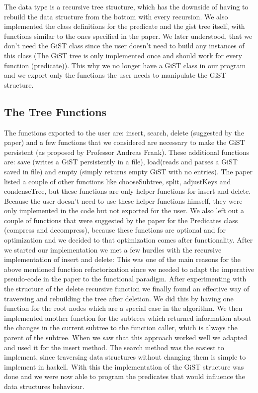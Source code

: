 \documentclass{scrartcl}
\begin{document}
 The data type is a recursive tree structure, which has the downside of having to rebuild the data structure from the bottom with every recursion.
 We also implemented the class definitions for the predicate and the gist tree itself, with functions similar to the ones specified in the paper. 
 We later understood, that we don't need the GiST class since the user doesn't need to build any instances of this class (The GiST tree is only implemented once and should work
 for every function (predicate)). This why we no longer have a GiST class in our program and we export only the functions the user needs to manipulate the GiST structure.
\subsection{The Tree Functions}
The functions exported to the user are: insert, search, delete (suggested by the paper) and a few functions that we considered are necessary to make the GiST persistent (as proposed by Professor Andreas Frank).
These additional functions are: save (writes a GiST persistently in a file), load(reads and parses a GiST saved in file) and empty (simply returns empty GiST with no entries).
The paper \cite{Hellerstein95generalizedsearch} listed a couple of other functions like chooseSubtree, split, adjustKeys and condenseTree, but these functions are only helper functions for insert and delete.
Because the user doesn't need to use these helper functions himself, they were only implemented in the code but not exported for the user.
We also left out a couple of functions that were suggested by the paper for the Predicates class (compress and decompress), because these functions are optional and for optimization and
we decided to that optimization comes after functionality.
After we started our implementation we met a few hurdles with the recursive implementation of insert and delete: This was one of the main reasons for the above mentioned function refactorization since we needed
to adapt the imperative pseudo-code in the paper to the functional paradigm.
After experimenting with the structure of the delete recursive function we finally found an effective way of traversing and rebuilding the tree after deletion. We did this
by having one function for the root nodes which are a special case in the algorithm.
We then implemented another function for the subtrees which returned information about the changes in the current subtree to the function caller, which is always the parent
of the subtree. When we saw that this approach worked well we adapted and used it for the insert method. The search method was the easiest to implement, since traversing data structures without changing 
them is simple to implement in haskell. With this the implementation of the GiST structure was done and we were now able to program the predicates that would influence the data structures behaviour.
\end{document}
